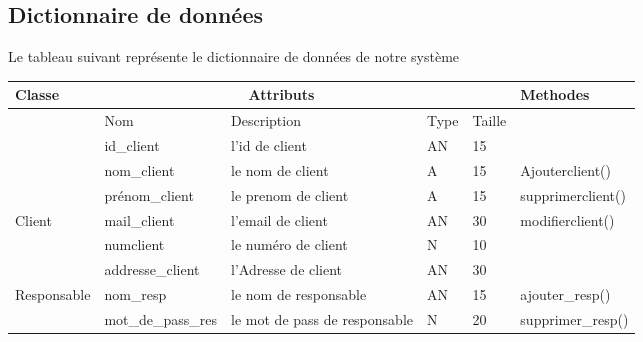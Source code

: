 \documentclass[edit,12pt,a4paper,ChapStyle,oneside,doubleinterligne]{report}
\begin{document}
\subsection{Dictionnaire de données}
Le tableau suivant représente le dictionnaire de données de notre système 
\begin{table}[h!]
    \centering
    \begin{tabular}{ | m{} | m{}| m{3cm} |m{}|m{}|l|}
    \hline
         Classe&\multicolumn{3}{c}{Attributs}&\phantom{h} &Methodes\\
         \hline &Nom&Description&Type&Taille&\\\cline{2-5}
                                        &id\_client    &l'id de client&AN&15& \\\cline{2-5}
                                        &nom\_client   &le nom de client&A&15&Ajouterclient() \\\cline{2-5}
                                        &prénom\_client&le prenom de client&A&15&supprimerclient() \\\cline{2-5}
                            Client      &mail\_client  &l'email de client&AN&30&modifierclient() \\\cline{2-5}
                                        &numclient    &le numéro de client&N&10&\\\cline{2-5}
                                        &addresse\_client&l'Adresse de client&AN&30&\\\hline
                                        

                                        
                            Responsable &nom\_resp &le nom de responsable&AN&15&ajouter\_resp()\\\cline{2-5}
                            &mot\_de\_pass\_res&le mot de pass de responsable&N&20&supprimer\_resp()\\\hline

                

 \end{tabular}
 
\end{table}
\end{document}
